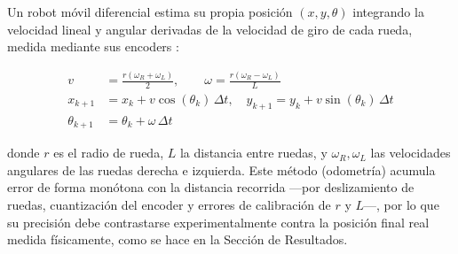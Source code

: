 Un robot móvil diferencial estima su propia posición $(x, y, \theta)$ integrando la velocidad lineal y angular derivadas de la velocidad de giro de cada rueda, medida mediante sus encoders \cite{siegwart}:

\begin{align}
v &= \frac{r(\omega_R + \omega_L)}{2}, \qquad \omega = \frac{r(\omega_R - \omega_L)}{L} \\
x_{k+1} &= x_k + v\cos(\theta_k)\,\Delta t, \quad y_{k+1} = y_k + v\sin(\theta_k)\,\Delta t \\
\theta_{k+1} &= \theta_k + \omega\,\Delta t
\end{align}

donde $r$ es el radio de rueda, $L$ la distancia entre ruedas, y $\omega_R, \omega_L$ las velocidades angulares de las ruedas derecha e izquierda. Este método (odometría) acumula error de forma monótona con la distancia recorrida —por deslizamiento de ruedas, cuantización del encoder y errores de calibración de $r$ y $L$—, por lo que su precisión debe contrastarse experimentalmente contra la posición final real medida físicamente, como se hace en la Sección de Resultados.
